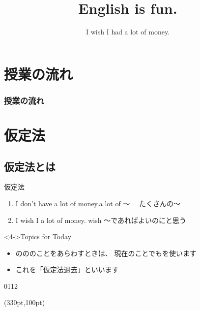 \documentclass[aspectratio=169,xcolor={dvipsnames,table}]{beamer}
\title{English is fun.}
\subtitle{I wish I had a lot of money.}
\author{}
\institute[]{}
\date[]
\begin{document}
\begin{frame}[plain]
  \titlepage
\end{frame}

\section*{授業の流れ}
\begin{frame}[plain]
  \frametitle{授業の流れ}
  \tableofcontents
\end{frame}

\section{仮定法}
\subsection{仮定法とは}
\begin{frame}[plain,t]{仮定法}
 \large

\begin{enumerate}
 \item<1-> I don't have a lot of money.\hfill{\scriptsize a lot of ～\,\,\,\,\,\,\,\,たくさんの～}
 \item<2-> I wish I  a lot of money.%
\hfill{\scriptsize wish  ～であればよいのにと思う}\\
\end{enumerate}

\vspace{80pt}

\begin{block}<4->{Topics for Today}
\small

\begin{itemize}[square]
 \item {}のののことをあらわすときは、
現在のことでもを使います
 \item これを「仮定法過去」といいます
\end{itemize}
\end{block}

\mbox{}\hfill{\tiny 0112}\,{{\scriptsize {}}} 


\begin{textblock*}{0.4\linewidth}(330pt,100pt)
\end{textblock*}
\end{frame}
\end{document}
